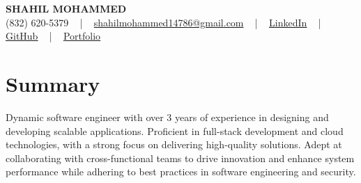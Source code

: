 \documentclass[letterpaper,10pt]{article}
\begin{document}
\begin{center}
    {\fontsize{14pt}{12pt}\selectfont \textbf{\MakeUppercase{Shahil Mohammed}}}\\ \vspace{2pt}
    \fontsize{10pt}{12pt}\selectfont (832) 620-5379 ~ | ~ \href{mailto:shahilmohammed14786@gmail.com}{shahilmohammed14786@gmail.com} ~ | ~  
    \href{https://www.linkedin.com/in/shahil-mohammed-9652931a1/}{\color{blue}\underline{LinkedIn}}  ~ | ~ 
    \href{https://github.com/freakbeast14}{\color{blue}\underline{GitHub}} ~ | ~ 
    \href{https://shahil-mohammed.netlify.app/}{\color{blue}\underline{Portfolio}}
    \vspace{-8pt}
\end{center}

\section{Summary}
\vspace{-2pt}\fontsize{8pt}{9pt}\selectfont
Dynamic software engineer with over 3 years of experience in designing and developing scalable applications. Proficient in full-stack development and cloud technologies, with a strong focus on delivering high-quality solutions. Adept at collaborating with cross-functional teams to drive innovation and enhance system performance while adhering to best practices in software engineering and security.

\vspace{-5pt}
 
\vspace{-2pt}
\end{document}
